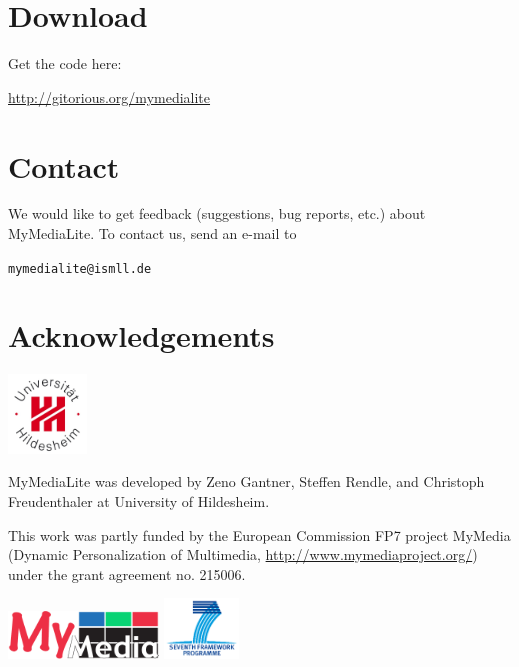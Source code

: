 \documentclass[a4paper, foldmark, 12pt]{leaflet}
\begin{document}
\newpage

\section{Download}
Get the code here:
\begin{center}
	\url{http://gitorious.org/mymedialite}
\end{center}

\section{Contact}
We would like to get feedback (suggestions, bug reports, etc.) about MyMediaLite.
To contact us, send an e-mail to
\begin{center}
	\texttt{mymedialite@ismll.de}
\end{center}

\section{Acknowledgements}

\begin{floatingfigure}[r]{1.6cm}
	\vspace{-0.5cm}
	\includegraphics[width=2.1cm]{fig/uni-hildesheim-400x400.jpg}
\end{floatingfigure}
MyMediaLite was developed by Zeno Gantner,
Steffen Rendle, and Christoph Freudenthaler
at University of Hildesheim.
	
\vspace{0.4cm}

This work was partly funded by the European Commission FP7 project MyMedia
(Dynamic Personalization of Multimedia, \url{http://www.mymediaproject.org/})
under the grant agreement no. 215006.

\vspace{0.2cm}

\begin{center}
	\includegraphics[width=4.0cm]{fig/MyMediaLogoMedium.png}
	\hspace{1.5cm}
	\includegraphics[width=2.0cm]{fig/logo-fp7.png}\\
\end{center}
\end{document}
